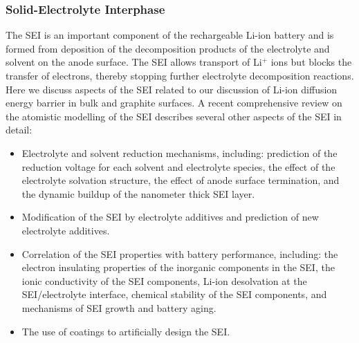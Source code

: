 \documentclass[../main.tex]{subfiles}
\begin{document}
\subsubsection{Solid-Electrolyte Interphase}
\label{sec:SEI}
The SEI is an important component of the rechargeable Li-ion battery and is formed from deposition of the decomposition products of the electrolyte and solvent on the anode surface. The SEI allows transport of Li$^+$ ions but blocks the transfer of electrons, thereby stopping further electrolyte decomposition reactions.\cite{Winter2009, VERMA20106332} Here we discuss aspects of the SEI related to our discussion of Li-ion diffusion energy barrier in bulk and graphite surfaces. A recent comprehensive review on the atomistic modelling of the SEI describes several other aspects of the SEI in detail:\cite{Wang2018} 
\begin{itemize}
    \item Electrolyte and solvent reduction mechanisms, including: prediction of the reduction voltage for each solvent and electrolyte species, the effect of the electrolyte solvation structure, the effect of anode surface termination, and the dynamic buildup of the nanometer thick SEI layer.
    \item Modification of the SEI by electrolyte additives and prediction of new electrolyte additives.
    \item Correlation of the SEI properties with battery performance, including: the electron insulating properties of the inorganic components in the SEI, the ionic conductivity of the SEI components, Li-ion desolvation at the SEI/electrolyte interface, chemical stability of the SEI components, and mechanisms of SEI growth and battery aging.
    \item The use of coatings to artificially design the SEI.
\end{itemize}
\end{document}
